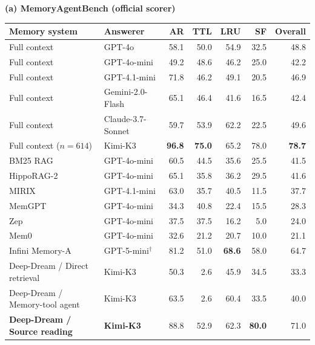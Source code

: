 \begin{table}[t]
\centering
\scriptsize
\setlength{\tabcolsep}{2.4pt}
\renewcommand{\arraystretch}{0.82}
{\footnotesize\textbf{(a) MemoryAgentBench (official scorer)}}\\[1.5pt]
\begin{tabular*}{\textwidth}{@{\extracolsep{\fill}}>{\raggedright\arraybackslash}p{}>{\raggedright\arraybackslash}p{}rrrrr@{}}
\toprule
Memory system & Answerer & AR & TTL & LRU & SF & Overall \\
\midrule
Full context & GPT-4o & 58.1 & 50.0 & 54.9 & 32.5 & 48.8 \\
Full context & GPT-4o-mini & 49.2 & 48.6 & 46.2 & 25.0 & 42.2 \\
Full context & GPT-4.1-mini & 71.8 & 46.2 & 49.1 & 20.5 & 46.9 \\
Full context & Gemini-2.0-Flash & 65.1 & 46.4 & 41.6 & 16.5 & 42.4 \\
Full context & Claude-3.7-Sonnet & 59.7 & 53.9 & 62.2 & 22.5 & 49.6 \\
\rowcolor{blue!9}
Full context ($n{=}614$) & Kimi-K3 & \textbf{96.8} & \textbf{75.0} & 65.2 & 78.0 & \textbf{78.7} \\
\midrule
BM25 RAG & GPT-4o-mini & 60.5 & 44.5 & 35.6 & 25.5 & 41.5 \\
HippoRAG-2 & GPT-4o-mini & 65.1 & 35.8 & 36.2 & 29.5 & 41.6 \\
MIRIX & GPT-4.1-mini & 63.0 & 35.7 & 40.5 & 11.5 & 37.7 \\
MemGPT & GPT-4o-mini & 34.3 & 40.8 & 22.4 & 15.5 & 28.3 \\
Zep & GPT-4o-mini & 37.5 & 37.5 & 16.2 & 5.0 & 24.0 \\
Mem0 & GPT-4o-mini & 32.6 & 21.2 & 20.7 & 10.0 & 21.1 \\
\rowcolor{green!9}
Infini Memory-A & GPT-5-mini$^\dagger$ & 81.2 & 51.0 & \textbf{68.6} & 58.0 & 64.7 \\
\midrule
\rowcolor{blue!9}
Deep-Dream / Direct retrieval & Kimi-K3 & 50.3 & 2.6 & 45.9 & 34.5 & 33.3 \\
\rowcolor{blue!9}
Deep-Dream / Memory-tool agent & Kimi-K3 & 63.5 & 2.6 & 60.4 & 33.5 & 40.0 \\
\rowcolor{blue!9}
\textbf{Deep-Dream / Source reading} & \textbf{Kimi-K3} & 88.8 & 52.9 & 62.3 & \textbf{80.0} & 71.0 \\
\bottomrule
\end{tabular*}


\end{table}
